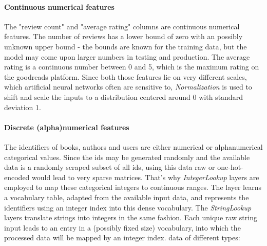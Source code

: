 \documentclass[10pt,final,journal,a4paper,oneside,twocolumn]{IEEEtran}
\begin{document}

\paragraph{Continuous numerical features}
The "review count" and "average rating" columns are continuous numerical features. The number of reviews has a lower bound of zero with an possibly unknown upper bound - the bounds are known for the training data, but the model may come upon larger numbers in testing and production. The average rating is a continuous number between 0 and 5, which is the maximum rating on the goodreads platform. Since both those features lie on very different scales, which artificial neural networks often are sensitive to, \emph{Normalization} is used to shift and scale the inputs to a distribution centered around 0 with standard deviation 1.

\paragraph{Discrete (alpha)numerical features}
The identifiers of books, authors and users are either numerical or alphanumerical categorical values. Since the ids may be generated randomly and the available data is a randomly scraped subset of all ids, using this data raw or one-hot-encoded would lead to very sparse matrices. That's why \emph{IntegerLookup} layers are employed to map these categorical integers to continuous ranges. The layer learns a vocabulary table, adapted from the available input data, and represents the identifiers using an integer index into this dense vocabulary. 
The \emph{StringLookup} layers translate strings into integers in the same fashion. Each unique raw string input leads to an entry in a (possibly fixed size) vocabulary, into which the processed data will be mapped by an integer index.
data of different types:
\end{document}
